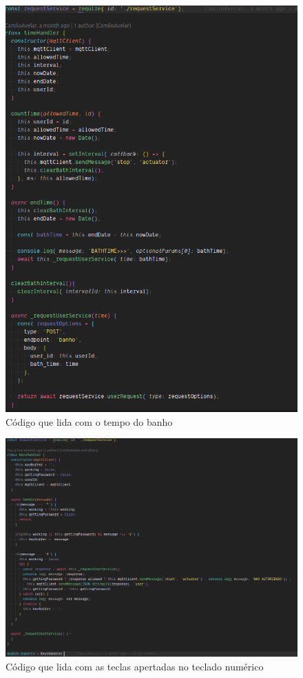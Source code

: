 \begin{figure}[htbp]
	\centering
	\includegraphics[width=1\linewidth]{figuras/mqttlogger/time.png}
	\caption{Código que lida com o tempo do banho}
	\label{fig:time}
\end{figure}

\begin{figure}[htbp]
	\centering
	\includegraphics[width=1\linewidth]{figuras/mqttlogger/keystopic.png}
	\caption{Código que lida com as teclas apertadas no teclado numérico}
	\label{fig:keys}
\end{figure}

